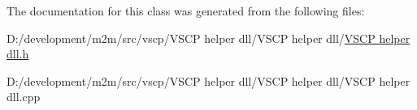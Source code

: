 The documentation for this class was generated from the following files:\begin{DoxyCompactItemize}
\item 
D:/development/m2m/src/vscp/VSCP helper dll/VSCP helper dll/\hyperlink{_v_s_c_p_01helper_01dll_8h}{VSCP helper dll.h}\item 
D:/development/m2m/src/vscp/VSCP helper dll/VSCP helper dll/VSCP helper dll.cpp\end{DoxyCompactItemize}
